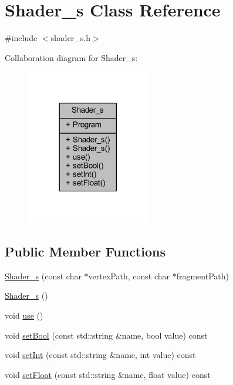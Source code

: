 \hypertarget{class_shader__s}{}\section{Shader\+\_\+s Class Reference}
\label{class_shader__s}


{\ttfamily \#include $<$shader\+\_\+s.\+h$>$}



Collaboration diagram for Shader\+\_\+s\+:
\nopagebreak
\begin{figure}[H]
\begin{center}
\leavevmode
\includegraphics[width=153pt]{class_shader__s__coll__graph}
\end{center}
\end{figure}
\subsection*{Public Member Functions}
\begin{DoxyCompactItemize}
\item 
\mbox{\hyperlink{class_shader__s_a564b38d9a18dd88011f61410fbbc1135}{Shader\+\_\+s}} (const char $\ast$vertex\+Path, const char $\ast$fragment\+Path)
\item 
\mbox{\hyperlink{class_shader__s_a197c14ea44e43468e43410c3ea47990c}{Shader\+\_\+s}} ()
\item 
void \mbox{\hyperlink{class_shader__s_ab9a0962e895e47de837d2d42279b6007}{use}} ()
\item 
void \mbox{\hyperlink{class_shader__s_a879f2669407bc55f15ec7cb7bdeb372c}{set\+Bool}} (const std\+::string \&name, bool value) const
\item 
void \mbox{\hyperlink{class_shader__s_a0fc37a704c203a98bbd82f101c0efd06}{set\+Int}} (const std\+::string \&name, int value) const
\item 
void \mbox{\hyperlink{class_shader__s_ae20f4a11d558909ffb59584da4b5a534}{set\+Float}} (const std\+::string \&name, float value) const
\end{DoxyCompactItemize}
